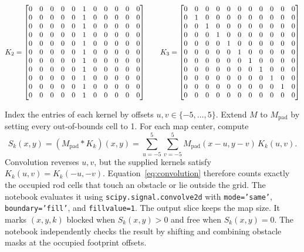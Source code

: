 \documentclass[11pt,a4paper]{article}
\begin{document}
\begingroup\footnotesize\setlength{\arraycolsep}{2.2pt}
\[
K_2=\left[\begin{array}{@{}*{11}{c}@{}}
0 & 0 & 0 & 0 & 0 & 1 & 0 & 0 & 0 & 0 & 0 \\
0 & 0 & 0 & 0 & 0 & 1 & 0 & 0 & 0 & 0 & 0 \\
0 & 0 & 0 & 0 & 0 & 1 & 0 & 0 & 0 & 0 & 0 \\
0 & 0 & 0 & 0 & 0 & 1 & 0 & 0 & 0 & 0 & 0 \\
0 & 0 & 0 & 0 & 0 & 1 & 0 & 0 & 0 & 0 & 0 \\
0 & 0 & 0 & 0 & 0 & 1 & 0 & 0 & 0 & 0 & 0 \\
0 & 0 & 0 & 0 & 0 & 1 & 0 & 0 & 0 & 0 & 0 \\
0 & 0 & 0 & 0 & 0 & 1 & 0 & 0 & 0 & 0 & 0 \\
0 & 0 & 0 & 0 & 0 & 1 & 0 & 0 & 0 & 0 & 0 \\
0 & 0 & 0 & 0 & 0 & 1 & 0 & 0 & 0 & 0 & 0 \\
0 & 0 & 0 & 0 & 0 & 1 & 0 & 0 & 0 & 0 & 0
\end{array}\right]\qquad K_3=\left[\begin{array}{@{}*{11}{c}@{}}
0 & 0 & 0 & 0 & 0 & 0 & 0 & 0 & 0 & 0 & 0 \\
0 & 1 & 0 & 0 & 0 & 0 & 0 & 0 & 0 & 0 & 0 \\
0 & 0 & 1 & 0 & 0 & 0 & 0 & 0 & 0 & 0 & 0 \\
0 & 0 & 0 & 1 & 0 & 0 & 0 & 0 & 0 & 0 & 0 \\
0 & 0 & 0 & 0 & 1 & 0 & 0 & 0 & 0 & 0 & 0 \\
0 & 0 & 0 & 0 & 0 & 1 & 0 & 0 & 0 & 0 & 0 \\
0 & 0 & 0 & 0 & 0 & 0 & 1 & 0 & 0 & 0 & 0 \\
0 & 0 & 0 & 0 & 0 & 0 & 0 & 1 & 0 & 0 & 0 \\
0 & 0 & 0 & 0 & 0 & 0 & 0 & 0 & 1 & 0 & 0 \\
0 & 0 & 0 & 0 & 0 & 0 & 0 & 0 & 0 & 1 & 0 \\
0 & 0 & 0 & 0 & 0 & 0 & 0 & 0 & 0 & 0 & 0
\end{array}\right]
\]
\endgroup

Index the entries of each kernel by offsets \(u,v\in\{-5,\ldots,5\}\).
Extend \(M\) to \(M_{\mathrm{pad}}\) by setting every out-of-bounds cell
to 1. For each map center, compute
\begin{equation}
S_k(x,y)=(M_{\mathrm{pad}} * K_k)(x,y)
  =\sum_{u=-5}^{5}\sum_{v=-5}^{5}
  M_{\mathrm{pad}}(x-u,y-v)\,K_k(u,v).
\label{eq:convolution}
\end{equation}
Convolution reverses \(u,v\), but the supplied kernels satisfy
\(K_k(u,v)=K_k(-u,-v)\). Equation~\eqref{eq:convolution} therefore counts
exactly the occupied rod cells that touch an obstacle or lie outside the
grid. The notebook evaluates it using \texttt{scipy.signal.convolve2d}
with \texttt{mode='same'}, \texttt{boundary='fill'}, and \texttt{fillvalue=1}.
The output slice keeps the map size. It marks \((x,y,k)\) blocked when
\(S_k(x,y)>0\) and free when \(S_k(x,y)=0\). The notebook independently
checks the result by shifting and combining obstacle masks at the occupied
footprint offsets.
\end{document}

